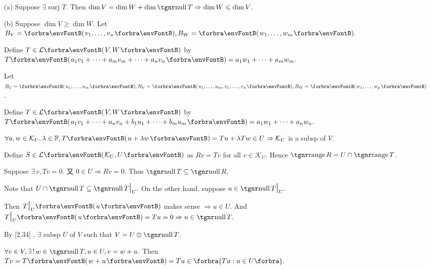 \documentclass[a4paper, 11pt, UTF8]{article}
\begin{document}
\begin{large}
\par\quad
(a) Suppose $\exists$ surj $T$. Then $\dim V=\dim W+\dim\null T\Rightarrow\dim W\leqslant\dim V$.\par\quad
(b) Suppose $\dim V\geqslant\dim W.$ Let $B_V=\Par{v_1,\dots,v_n},B_W=\Par{w_1,\dots,w_m}.$\par\quad\Hb
Define $T\in\Lm{V,W}$ by $T\Par{a_1 v_1+\dots+a_m v_m+\dots+a_n v_n}=a_1 w_1+\dots+a_m w_m.$\PfEnd
\SepLine

\par\quad
Let $B_U=\Par{u_1,\dots,u_m},B_V=\Par{u_1,\dots,u_m,v_1,\dots,v_n},B_W=\Par{w_1,\dots,w_p}$.\par\quad
Define $T\in\Lm{V,W}$ by $T\Par{a_1 v_1+\dots+a_n v_n+b_1 u_1+\dots+b_m u_m}=a_1 w_1+\dots+a_n w_n.$\PfEnd
\SepLine

\par\quad
$\forall u,w\in\mathcal{K}_U,\lambda\in\Fbb,T\Par{u+\lambda w}=Tu+\lambda Tw\in U\Rightarrow \mathcal{K}_U$ is a subsp of $V$.\par\quad
Define $S\in\Lm{\mathcal{K}_U,U}$ as $Rv=Tv$ for all $v\in\mathcal{K}_U$. Hence $\range R=U\cap \range T$.\par\quad
Suppose $\exists\,v,Tv=0$. 又 $0\in U\Rightarrow Rv=0$. Thus $\null T\subseteq\null R.$\PfEnd
\SepLine

Note that $U\cap\null T\subseteq\null T\mid_U.$ On the other hand, suppose $u\in\null T\mid_U.$\par
\Blind{\Solution} Then $T\mid_U\Par{u}$ makes sense $\Rightarrow u\in U.$ And $T\mid_U\Par{u}=Tu=0\Rightarrow u\in\null T.$\PfEnd
\SepLine

\par\quad
By [2.34] , $\exists$ subsp $U$ of $V$ such that $V=U\oplus\null T$.\par\quad
$\forall v\in V,\exists\,!\,w\in\null T,u\in U, v=w+u.$ Then $Tv=T\Par{w+u}=Tu\in\Bra{Tu:u\in U}.$\PfEnd
\SepLine


\end{large}
\end{document}
